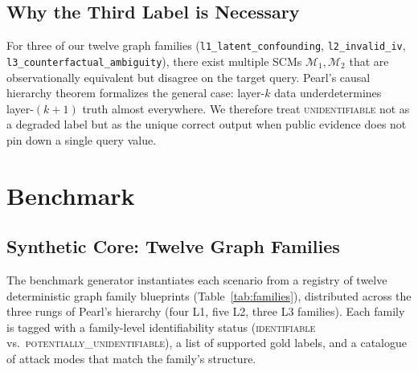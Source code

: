 \documentclass{article}
\theoremstyle{plain}
\theoremstyle{definition}
\theoremstyle{remark}
\begin{document}
\subsection{Why the Third Label is Necessary}
\label{sec:third-label}

For three of our twelve graph families (\texttt{l1\_latent\_confounding},
\texttt{l2\_invalid\_iv}, \texttt{l3\_counterfactual\_ambiguity}), there exist
multiple SCMs $\mathcal{M}_1, \mathcal{M}_2$ that are observationally
equivalent but disagree on the target query. Pearl's causal hierarchy theorem
\cite{bareinboim2022pearl} formalizes the general case: layer-$k$ data
underdetermines layer-$(k+1)$ truth almost everywhere. We therefore treat
\textsc{unidentifiable} not as a degraded label but as the unique correct
output when public evidence does not pin down a single query value.

\section{Benchmark}
\label{sec:benchmark}

\subsection{Synthetic Core: Twelve Graph Families}

The benchmark generator instantiates each scenario from a registry of twelve
deterministic graph family blueprints (Table~\ref{tab:families}), distributed
across the three rungs of Pearl's hierarchy (four L1, five L2, three L3
families). Each family is tagged with a family-level
identifiability status (\textsc{identifiable} vs.\
\textsc{potentially\_unidentifiable}), a list of supported gold labels, and a
catalogue of attack modes that match the family's structure.
\end{document}
